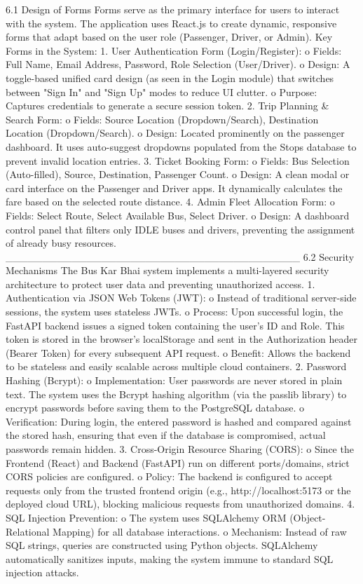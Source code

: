 6.1 Design of Forms
Forms serve as the primary interface for users to interact with the system. The application uses React.js to create dynamic, responsive forms that adapt based on the user role (Passenger, Driver, or Admin).
Key Forms in the System:
1.	User Authentication Form (Login/Register):
o	Fields: Full Name, Email Address, Password, Role Selection (User/Driver).
o	Design: A toggle-based unified card design (as seen in the Login module) that switches between "Sign In" and "Sign Up" modes to reduce UI clutter.
o	Purpose: Captures credentials to generate a secure session token.
2.	Trip Planning & Search Form:
o	Fields: Source Location (Dropdown/Search), Destination Location (Dropdown/Search).
o	Design: Located prominently on the passenger dashboard. It uses auto-suggest dropdowns populated from the Stops database to prevent invalid location entries.
3.	Ticket Booking Form:
o	Fields: Bus Selection (Auto-filled), Source, Destination, Passenger Count.
o	Design: A clean modal or card interface on the Passenger and Driver apps. It dynamically calculates the fare based on the selected route distance.
4.	Admin Fleet Allocation Form:
o	Fields: Select Route, Select Available Bus, Select Driver.
o	Design: A dashboard control panel that filters only IDLE buses and drivers, preventing the assignment of already busy resources.
________________________________________
6.2 Security Mechanisms
The Bus Kar Bhai system implements a multi-layered security architecture to protect user data and preventing unauthorized access.
1.	Authentication via JSON Web Tokens (JWT):
o	Instead of traditional server-side sessions, the system uses stateless JWTs.
o	Process: Upon successful login, the FastAPI backend issues a signed token containing the user's ID and Role. This token is stored in the browser's localStorage and sent in the Authorization header (Bearer Token) for every subsequent API request.
o	Benefit: Allows the backend to be stateless and easily scalable across multiple cloud containers.
2.	Password Hashing (Bcrypt):
o	Implementation: User passwords are never stored in plain text. The system uses the Bcrypt hashing algorithm (via the passlib library) to encrypt passwords before saving them to the PostgreSQL database.
o	Verification: During login, the entered password is hashed and compared against the stored hash, ensuring that even if the database is compromised, actual passwords remain hidden.
3.	Cross-Origin Resource Sharing (CORS):
o	Since the Frontend (React) and Backend (FastAPI) run on different ports/domains, strict CORS policies are configured.
o	Policy: The backend is configured to accept requests only from the trusted frontend origin (e.g., http://localhost:5173 or the deployed cloud URL), blocking malicious requests from unauthorized domains.
4.	SQL Injection Prevention:
o	The system uses SQLAlchemy ORM (Object-Relational Mapping) for all database interactions.
o	Mechanism: Instead of raw SQL strings, queries are constructed using Python objects. SQLAlchemy automatically sanitizes inputs, making the system immune to standard SQL injection attacks.

